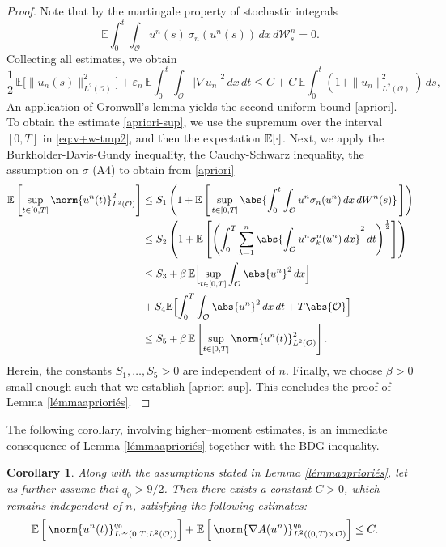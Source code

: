 \documentclass[10pt,number,preprint,times]{elsarticle}
\numberwithin{equation}{section} %
\newtheorem{cor}{Corollary}[section]
\newcommand{\E}{\ensuremath{\Bbb{E}}}
\begin{document}
\begin{proof}
{Note that by the martingale property of stochastic integrals
$$
\mathbb{E} \int_0^t\int_{\mathcal{O}} u^n(s)\,\sigma_n(u^n(s)) \,dx\,d\mathcal{W}^n_s=0.
$$
Collecting all estimates, we obtain
$$
\frac{1}{2}\,\mathbb E\Big[\|u_n(s)\|_{L^2(\mathcal{O})}^2\Big]
+ \varepsilon_n\,\mathbb E\int_0^t\int_{\mathcal O}|\nabla u_n|^2\,dx\,dt
\le C + C\,\mathbb E\int_0^t(1+\|u_n\|_{L^2(\mathcal{O})}^2)\,ds,
$$
An application of Gronwall's lemma yields the second uniform bound \eqref{apriori}.\\
To obtain the estimate \eqref{apriori-sup}, we use the supremum over the interval $[0, T]$ in \eqref{eq:v+w-tmp2},
and then the expectation $\E[\cdot]$. Next, we apply the Burkholder-Davis-Gundy inequality, the 
Cauchy-Schwarz inequality, the assumption on $\sigma$ (A4) to obtain from \eqref{apriori}
\begin{equation}\label{Esup1}
	\begin{split}
		 \E\left[ \sup_{t\in [0,T]} 
		\norm{u^n(t)}_{L^2(\mathcal O)}^2\right]  & \leq S_1\left(1 +
		\E\left[\, \sup_{t\in [0,T]} \abs{\int_0^t\int_{\mathcal O} 
		u^n \sigma_n(u^n) \,dx \,dW^{n}(s)}\, \right]\right)
		\\ &   \leq S_2 \left(1+\E \left[ \left(\int_0^T 
		\sum_{k=1}^n \abs{\int_{\mathcal O} u^n 
		\sigma^n_{k}(u^n) \,dx}^2 \,dt \right)^{\frac12}\right]\right)
		\\ &  \le  S_3 +
		\beta \, \E \Bigl[\sup_{t\in [0,T]}\int_{\mathcal O} \abs{u^n}^2\,dx\Bigl]
		\\ &+S_4
		\E\Bigl[ \int_0^T\int_{\mathcal O} \abs{u^n}^2 \,dx\,dt
		+T \abs{\mathcal O}\Bigl]
		\\ &  \leq S_5+  \beta\, \E\left[ \sup_{t\in [0,T]} 
		\norm{u^n(t)}_{L^2(\mathcal O)}^2\right].
	\end{split}
\end{equation}
Herein, the constants $S_1,\dots,S_5>0$ 
are independent of $n$. Finally, we choose $\beta>0$ small enough such that we establish \eqref{apriori-sup}.
This concludes the proof of Lemma \ref{lémmaaprioriés}.
}
\end{proof}

The following corollary, involving higher–moment estimates, is an immediate consequence of Lemma \ref{lémmaaprioriés} together with the BDG inequality. 

\begin{cor}\label{cor:Lq0-est}
Along with the assumptions stated in Lemma \ref{lémmaaprioriés}, 
let us further assume that $q_0>9/2$. 
Then there exists a constant $C > 0$, which remains 
independent of $n$, satisfying 
the following estimates:
\begin{equation}\label{eq:Lq0-est}
	\begin{split}
		&\E\left[ 
		\, \norm{u^n(t)}_{L^\infty(0,T;L^2(\mathcal{O}))}^{q_0}\right]+\E\left[ \,
	\norm{\nabla A(u^n)}_{L^2((0,T)\times \mathcal{O})}^{q_0}
	\right] \le C.
	\end{split}
\end{equation}

\end{cor}
\end{document}
